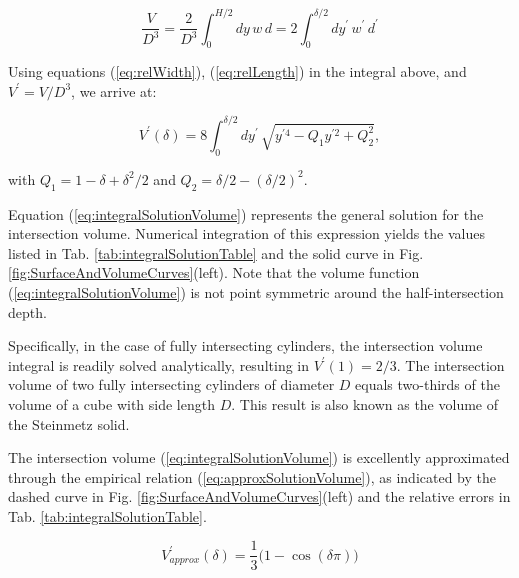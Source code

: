 \documentclass[authoryear]{elsarticle}
\begin{document}
    \begin{equation*}
        \frac{V}{D^3} 
        = \frac{2}{D^3} \int_0^{H/2} dy \, w \, d  
        = 2 \int_0^{\delta/2} dy^\prime \, w^\prime \, d^\prime
    \end{equation*}

    Using equations (\ref{eq:relWidth}), (\ref{eq:relLength}) in the integral above, and $V^\prime = V/D^3$, we arrive at:
    
    \begin{equation} \label{eq:integralSolutionVolume}        
        V^\prime (\delta)
        = 8 \int_0^{\delta/2} dy^\prime \, \sqrt{ 
            y^{\prime 4} - Q_1 y^{\prime 2} + Q_2^2 } ,
    \end{equation}

    with $Q_1 = 1 - \delta + \delta^2/2$ and $Q_2 = \delta/2 - (\delta/2)^2 $. 

    Equation (\ref{eq:integralSolutionVolume}) represents the general solution for the intersection volume. 
    Numerical integration of this expression yields the values listed in Tab. \ref{tab:integralSolutionTable} and the solid curve in Fig. \ref{fig:SurfaceAndVolumeCurves}(left).
    Note that the volume function (\ref{eq:integralSolutionVolume}) is not point symmetric around the half-intersection depth.

    Specifically, in the case of fully intersecting cylinders, the intersection volume integral is readily solved analytically, resulting in $V^\prime (1) = 2/3$.
    The intersection volume of two fully intersecting cylinders of diameter $D$ equals two-thirds of the volume of a cube with side length $D$. 
    This result is also known as the volume of the Steinmetz solid. 

    The intersection volume (\ref{eq:integralSolutionVolume}) is excellently approximated through the empirical relation (\ref{eq:approxSolutionVolume}), as indicated by the dashed curve in Fig. \ref{fig:SurfaceAndVolumeCurves}(left) and the relative errors in Tab. \ref{tab:integralSolutionTable}.

    \begin{equation}\label{eq:approxSolutionVolume}
        V^\prime_{approx}(\delta) = \frac{1}{3} \Big( 1 - \cos( \delta \pi ) \Big)
    \end{equation}
    
\end{document}
